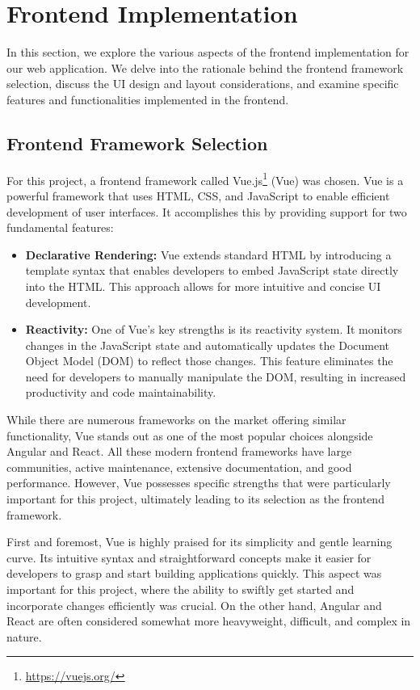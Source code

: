 \documentclass[12pt,oneside,bibtotoc,liststotoc]{scrbook}
\begin{document}
\section{Frontend Implementation}
In this section, we explore the various aspects of the frontend implementation for our web application. We delve into the rationale behind the frontend framework selection, discuss the UI design and layout considerations, and examine specific features and functionalities implemented in the frontend.

\subsection{Frontend Framework Selection}
For this project, a frontend framework called Vue.js\footnote{\url{https://vuejs.org/}} (Vue) was chosen. Vue is a powerful framework that uses HTML, CSS, and JavaScript to enable efficient development of user interfaces. It accomplishes this by providing support for two fundamental features:

\begin{itemize}
  \item \textbf{Declarative Rendering:} Vue extends standard HTML by introducing a template syntax that enables developers to embed JavaScript state directly into the HTML. This approach allows for more intuitive and concise UI development.

  \item \textbf{Reactivity:} One of Vue's key strengths is its reactivity system. It monitors changes in the JavaScript state and automatically updates the Document Object Model (DOM) to reflect those changes. This feature eliminates the need for developers to manually manipulate the DOM, resulting in increased productivity and code maintainability.
\end{itemize} \cite{vuejs}

While there are numerous frameworks on the market offering similar functionality, Vue stands out as one of the most popular choices alongside Angular and React. All these modern frontend frameworks have large communities, active maintenance, extensive documentation, and good performance. However, Vue possesses specific strengths that were particularly important for this project, ultimately leading to its selection as the frontend framework.

First and foremost, Vue is highly praised for its simplicity and gentle learning curve. Its intuitive syntax and straightforward concepts make it easier for developers to grasp and start building applications quickly. This aspect was important for this project, where the ability to swiftly get started and incorporate changes efficiently was crucial. On the other hand, Angular and React are often considered somewhat more heavyweight, difficult, and complex in nature. \cite{KernComparing}
\end{document}
